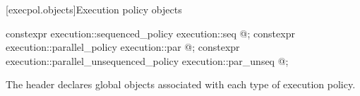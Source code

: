 [execpol.objects]{Execution policy objects}

%
%
%
%
%
%
\begin{itemdecl}
constexpr execution::sequenced_policy            execution::seq{ @\unspec@ };
constexpr execution::parallel_policy             execution::par{ @\unspec@ };
constexpr execution::parallel_unsequenced_policy execution::par_unseq{ @\unspec@ };
\end{itemdecl}

\begin{itemdescr}
\pnum
The header  declares global objects associated with each type of execution policy.
\end{itemdescr}
